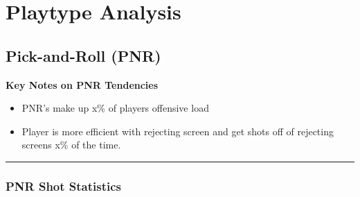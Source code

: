 \documentclass[a4paper,12pt]{article}
\begin{document}
\newpage
\section{Playtype Analysis}

\subsection{Pick-and-Roll (PNR)}
\vspace{1.25em} %
\textbf{Key Notes on PNR Tendencies}
\vspace{0.5em} %

\begin{itemize}
    \item PNR's make up x\% of players offensive load
    \vspace{0.3em} %
    \item Player is more efficient with rejecting screen and get shots off of rejecting screens x\% of the time.
\end{itemize}

\vspace{1em} %
\hrule height 1pt width 1\textwidth %
\vspace{0em} %

\subsubsection{PNR Shot Statistics}
\end{document}
